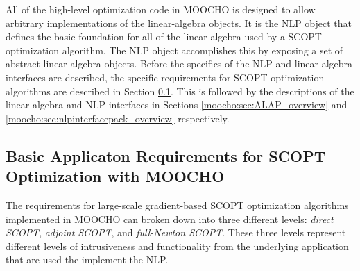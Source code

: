 \documentclass[pdf,ps2pdf,11pt]{SANDreport}
\begin{document}
All of the high-level optimization code in MOOCHO is designed to allow
arbitrary implementations of the linear-algebra objects.  It is the NLP object
that defines the basic foundation for all of the linear algebra used by a SCOPT
optimization algorithm.  The NLP object accomplishes this by exposing a set of
abstract linear algebra objects.  Before the specifics of the NLP and linear
algebra interfaces are described, the specific requirements for SCOPT
optimization algorithms are described in Section
{}\ref{moocho:sec:nlp_requirements}.  This is followed by the descriptions of
the linear algebra and NLP interfaces in Sections
{}\ref{moocho:sec:ALAP_overview} and
{}\ref{moocho:sec:nlpinterfacepack_overview} respectively.

%
\subsection{Basic Applicaton Requirements for SCOPT Optimization with MOOCHO}
\label{moocho:sec:nlp_requirements}
% 

The requirements for large-scale gradient-based SCOPT optimization
algorithms implemented in MOOCHO can broken down into three different
levels: \textit{direct SCOPT}, \textit{adjoint SCOPT}, and
{}\textit{full-Newton SCOPT}.  These three levels represent different
levels of intrusiveness and functionality from the underlying
application that are used the implement the NLP.
\end{document}
